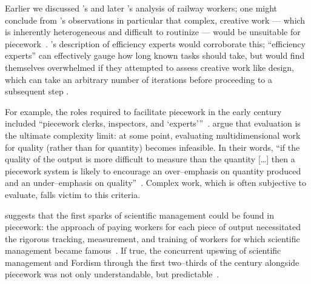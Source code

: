 \documentclass[trackingWork]{subfiles}
\begin{document}
{
Earlier we discussed \citeauthor{10.2307/23702539}'s and later \citeauthor{Brown01041990}'s analysis of railway workers;
one might conclude from \citeauthor{10.2307/23702539}'s observations in particular that
complex, creative work
--- which is inherently heterogeneous and difficult to routinize ---
would be unsuitable for piecework~\cite{10.2307/23702539}.
\citeauthor{Brown01041990}'s description of efficiency experts would corroborate this;
``efficiency experts'' can effectively gauge how long known tasks should take, but
would find themselves overwhelmed if they attempted to assess creative work like design,
which can take an arbitrary number of iterations before proceeding to a subsequent step
.

For example, the roles required to facilitate piecework in the early  century included ``piecework clerks, inspectors, and `experts'''~\cite{10.2307/23702539}.
\citeauthor{hart2016rise} argue that evaluation is the ultimate complexity limit:
at some point, evaluating multidimensional work for quality
(rather than for quantity) becomes infeasible.
In their words,
``if the quality of the output is more difficult to measure than the quantity [\ldots]
then a piecework system is likely to encourage
an over--emphasis on quantity produced and an under--emphasis on quality''~\cite{hart2016rise}.
Complex work, which is often subjective to evaluate, falls victim to this criteria.

\citeauthor{10.2307/23702539} suggests that the first sparks of scientific management
could be found in piecework:
the approach of paying workers for each piece of output necessitated
the rigorous tracking, measurement, and training of workers
for which scientific management became famous~\cite{10.2307/23702539}.
If true, 
the concurrent upswing of
scientific management and Fordism
through the first two--thirds of the  century
alongside piecework was not only understandable, but predictable~\cite{hart2013rise}.

}
\end{document}
